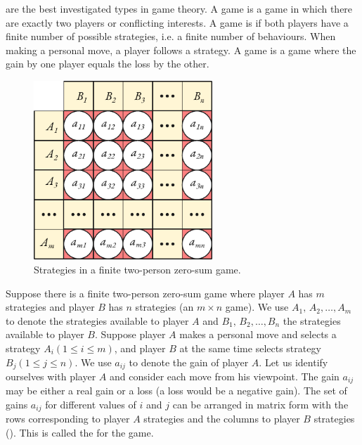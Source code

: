   are the best investigated types in game theory. A  game is a game in which there are exactly two players or conflicting interests. A game is  if both players have a finite number of possible strategies, i.e. a finite number of behaviours. When making a personal move, a player
follows a strategy. A  game is a game where the gain by one
player equals the loss by the other.

 \begin{figure}[!h]
 \centering
 \includegraphics[width=0.6\textwidth]{figures/two-player1.pdf}
\caption{Strategies in a finite two-person zero-sum game.\label{twoplayer1}}
 \end{figure}

Suppose there is a finite two-person zero-sum game where player
$A$ has $m$ strategies and player $B$ has $n$ strategies (an $m \times n$ game). We use $A_{1}, \, A_{2}, \ldots, A_{m}$ to denote the strategies available to player $A$ and $B_{1}, \, B_{2}, \ldots, B_{n}$ the strategies available to player $B$. Suppose player $A$ makes a personal move and selects a strategy $A_{i} (1 \leqslant i \leqslant m)$, and player $B$ at the same time selects strategy $B_{j} (1 \leqslant j \leqslant n)$. We use $a_{ij}$ to denote the gain of player $A$. Let us identify ourselves with player $A$ and consider each move from his viewpoint. The gain $a_{ij}$ may be either a real gain or a loss (a loss would be a negative gain). The set of gains $a_{ij}$ for different values of $i$ and $j$ can be arranged in matrix form with the rows corresponding to player $A$ strategies and the columns to player $B$ strategies (). This is called the  for the game.

